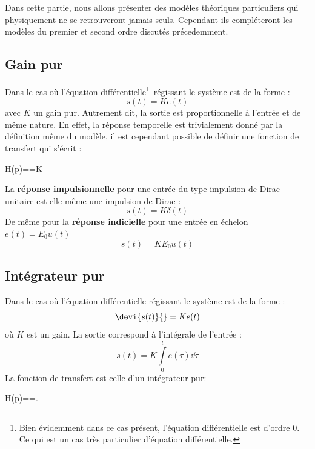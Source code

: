 Dans cette partie, nous allons présenter des modèles théoriques particuliers 
qui physiquement ne se retrouveront jamais seuls. Cependant ils compléteront les 
modèles du premier et second ordre discutés précedemment.

\subsection{Gain pur}
Dans le cas où l'équation différentielle\footnote{Bien évidemment 
dans ce cas présent, l'équation différentielle est d'ordre 0. Ce qui est 
un cas très particulier d'équation différentielle.}~régissant le système est de la forme :
$$
s(t)=Ke(t)
$$
avec $K$ un gain pur. Autrement dit, la sortie est proportionnelle à l'entrée et
de même nature.
En effet, la réponse temporelle est trivialement donné par la définition 
même du modèle, il est cependant possible de définir une fonction
de transfert qui s'écrit :
\begin{bequation}
H(p)==K
\end{bequation}
La \textbf{réponse impulsionnelle} pour une entrée du type impulsion de Dirac unitaire 
est elle même une impulsion de Dirac :
$$
s(t)=K\delta(t)
$$
De même pour la \textbf{réponse indicielle} pour une entrée en échelon $e(t)=E_0u(t)$
$$
s(t)=KE_0u(t)
$$
\subsection{Intégrateur pur}
Dans le cas où l'équation différentielle régissant le système est de la forme :
$$
\devi{s(t)}{}=Ke(t)
$$
où $K$ est un gain. La sortie correspond à l'intégrale de l'entrée :
$$
s(t)=K\int\limits_0^t e(\tau)\dd{\tau}
$$
La fonction de transfert est celle d'un intégrateur pur:
\begin{bequation}
H(p)==.
\end{bequation}

